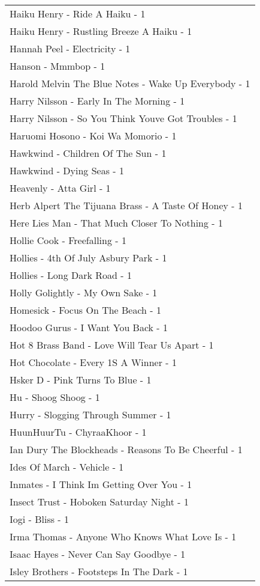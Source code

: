 \documentclass[
]{article}
\begin{document}
\begin{longtable}{l}
Haiku Henry - Ride A Haiku - 1 \\ 
Haiku Henry - Rustling Breeze A Haiku - 1 \\ 
Hannah Peel - Electricity - 1 \\ 
Hanson - Mmmbop - 1 \\ 
Harold Melvin The Blue Notes - Wake Up Everybody - 1 \\ 
Harry Nilsson - Early In The Morning - 1 \\ 
Harry Nilsson - So You Think Youve Got Troubles - 1 \\ 
Haruomi Hosono - Koi Wa Momorio - 1 \\ 
Hawkwind - Children Of The Sun - 1 \\ 
Hawkwind - Dying Seas - 1 \\ 
Heavenly - Atta Girl - 1 \\ 
Herb Alpert The Tijuana Brass - A Taste Of Honey - 1 \\ 
Here Lies Man - That Much Closer To Nothing - 1 \\ 
Hollie Cook - Freefalling - 1 \\ 
Hollies - 4th Of July Asbury Park - 1 \\ 
Hollies - Long Dark Road - 1 \\ 
Holly Golightly - My Own Sake - 1 \\ 
Homesick - Focus On The Beach - 1 \\ 
Hoodoo Gurus - I Want You Back - 1 \\ 
Hot 8 Brass Band - Love Will Tear Us Apart - 1 \\ 
Hot Chocolate - Every 1S A Winner - 1 \\ 
Hsker D - Pink Turns To Blue - 1 \\ 
Hu - Shoog Shoog - 1 \\ 
Hurry - Slogging Through Summer - 1 \\ 
HuunHuurTu - ChyraaKhoor - 1 \\ 
Ian Dury The Blockheads - Reasons To Be Cheerful - 1 \\ 
Ides Of March - Vehicle - 1 \\ 
Inmates - I Think Im Getting Over You - 1 \\ 
Insect Trust - Hoboken Saturday Night - 1 \\ 
Iogi - Bliss - 1 \\ 
Irma Thomas - Anyone Who Knows What Love Is - 1 \\ 
Isaac Hayes - Never Can Say Goodbye - 1 \\ 
Isley Brothers - Footsteps In The Dark - 1 \\ 

\end{longtable}
\end{document}
